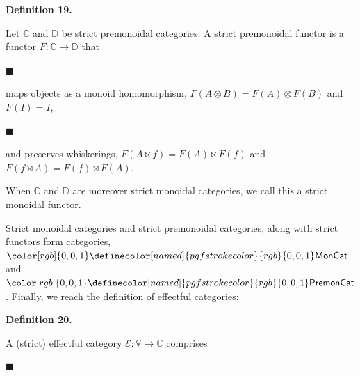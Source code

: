 \documentclass[10pt,a4paper]{article}
\begin{document}
\par\medskip\noindent\textbf{Definition 19.}\par
 
 
Let $\mathbb{C}$ and $\mathbb{D}$ be strict premonoidal categories. A strict premonoidal functor is a functor $F:\mathbb{C}\to\mathbb{D}$ that\par
  
\par\noindent  $\blacksquare$ 
 
maps objects as a monoid homomorphism, $F(A\otimes B)=F(A)\otimes F(B)$ and $F(I)=I$,\par
 
 
 
\par\noindent  $\blacksquare$ 
 
and preserves whiskerings, $F(A\ltimes f)=F(A)\ltimes F(f)$ and $F(f\rtimes A)=F(f)\rtimes F(A)$.\par
 
 
  
When $\mathbb{C}$ and $\mathbb{D}$ are moreover strict monoidal categories, we call this a strict monoidal functor.\par
 
 
 
 
Strict monoidal categories and strict premonoidal categories, along with strict functors form categories, ${\color[rgb]{0,0,1}\definecolor[named]{pgfstrokecolor}{rgb}{0,0,1}\mathsf{MonCat}}$ and ${\color[rgb]{0,0,1}\definecolor[named]{pgfstrokecolor}{rgb}{0,0,1}\mathsf{PremonCat}}$. Finally, we reach the definition of effectful categories:\par
 
 
 
\par\medskip\noindent\textbf{Definition 20.}\par
 
 
A (strict) effectful category $\mathscr{E}:\mathbb{V}\to\mathbb{C}$ comprises\par
  
\par\noindent  $\blacksquare$ 
 
\end{document}
